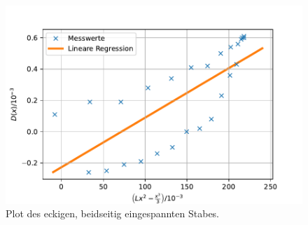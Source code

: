 \begin{figure}[H]
  \centering
  \includegraphics{pictures/Lineare Regression4.pdf}
  \caption{Plot des eckigen, beidseitig eingespannten Stabes.}
  \label{fig:plot3}
\end{figure}